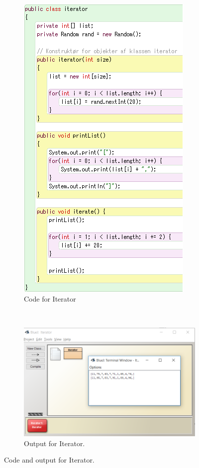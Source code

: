 \begin{figure}[!h]
  \centering      
    \begin{subfigure}[b]{0.45\textwidth}
    \begin{center}
      \includegraphics[scale=0.7]{./pics/bluej_iterator_actual_code}
      \caption{Code for Iterator}
      \label{fig:bluej_iterator_code}
    \end{center}
    \end{subfigure}
    ~
    \begin{subfigure}[b]{0.45\textwidth}
    \begin{center}
      \includegraphics[scale=0.6]{./pics/bluej_iterator_code}
      \caption{Output for Iterator.}
      \label{fig:bluej_iterator_code2}
    \end{center}
    \end{subfigure}
    \caption{Code and output for Iterator.}
    \label{fig:bluej_iterator}
\end{figure}

